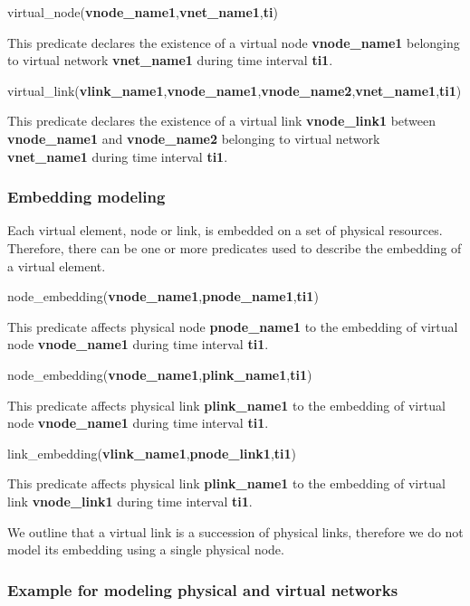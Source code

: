 virtual\_node(\textbf{vnode\_name1},\textbf{vnet\_name1},\textbf{ti})

This predicate declares the existence of a virtual node \textbf{vnode\_name1} belonging to virtual network \textbf{vnet\_name1} during time interval \textbf{ti1}.

virtual\_link(\textbf{vlink\_name1},\textbf{vnode\_name1},\textbf{vnode\_name2},\textbf{vnet\_name1},\textbf{ti1})

This predicate declares the existence of a virtual link \textbf{vnode\_link1} between \textbf{vnode\_name1} and \textbf{vnode\_name2} belonging to virtual network \textbf{vnet\_name1} during time interval \textbf{ti1}.


\subsubsection{Embedding modeling}
Each virtual element, node or link, is embedded on a set of physical resources.
Therefore, there can be one or more predicates used to describe the embedding of a virtual element.


node\_embedding(\textbf{vnode\_name1},\textbf{pnode\_name1},\textbf{ti1})

This predicate affects physical node \textbf{pnode\_name1} to the embedding of virtual node \textbf{vnode\_name1} during time interval \textbf{ti1}.

node\_embedding(\textbf{vnode\_name1},\textbf{plink\_name1},\textbf{ti1})

This predicate affects physical link \textbf{plink\_name1} to the embedding of virtual node \mbox{\textbf{vnode\_name1}} during time interval \textbf{ti1}.

link\_embedding(\textbf{vlink\_name1},\textbf{pnode\_link1},\textbf{ti1})

This predicate affects physical link \textbf{plink\_name1} to the embedding of virtual link \textbf{vnode\_link1} during time interval \textbf{ti1}.

We outline that a virtual link is a succession of physical links, therefore we do not model its embedding using a single physical node.


\subsubsection{Example for modeling physical and virtual networks}

